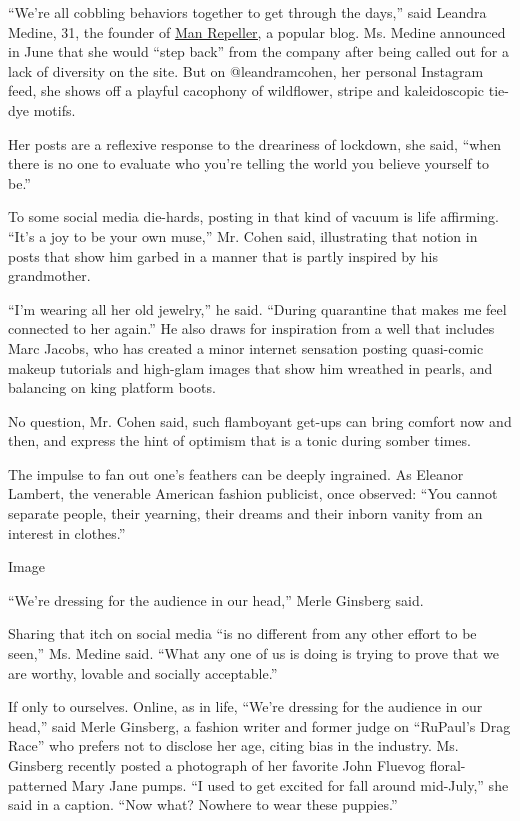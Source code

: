 ``We're all cobbling behaviors together to get through the days,'' said
Leandra Medine, 31, the founder of
\href{https://www.manrepeller.com/}{Man Repeller,} a popular blog. Ms.
Medine announced in June that she would ``step back'' from the company
after being called out for a lack of diversity on the site. But on
@leandramcohen, her personal Instagram feed, she shows off a playful
cacophony of wildflower, stripe and kaleidoscopic tie-dye motifs.

Her posts are a reflexive response to the dreariness of lockdown, she
said, ``when there is no one to evaluate who you're telling the world
you believe yourself to be.''

To some social media die-hards, posting in that kind of vacuum is life
affirming. ``It's a joy to be your own muse,'' Mr. Cohen said,
illustrating that notion in posts that show him garbed in a manner that
is partly inspired by his grandmother.

``I'm wearing all her old jewelry,'' he said. ``During quarantine that
makes me feel connected to her again.'' He also draws for inspiration
from a well that includes Marc Jacobs, who has created a minor internet
sensation posting quasi-comic makeup tutorials and high-glam images that
show him wreathed in pearls, and balancing on king platform boots.

No question, Mr. Cohen said, such flamboyant get-ups can bring comfort
now and then, and express the hint of optimism that is a tonic during
somber times.

The impulse to fan out one's feathers can be deeply ingrained. As
Eleanor Lambert, the venerable American fashion publicist, once
observed: ``You cannot separate people, their yearning, their dreams and
their inborn vanity from an interest in clothes.''

Image

``We're dressing for the audience in our head,'' Merle Ginsberg said.

Sharing that itch on social media ``is no different from any other
effort to be seen,'' Ms. Medine said. ``What any one of us is doing is
trying to prove that we are worthy, lovable and socially acceptable.''

If only to ourselves. Online, as in life, ``We're dressing for the
audience in our head,'' said Merle Ginsberg, a fashion writer and former
judge on ``RuPaul's Drag Race'' who prefers not to disclose her age,
citing bias in the industry. Ms. Ginsberg recently posted a photograph
of her favorite John Fluevog floral-patterned Mary Jane pumps. ``I used
to get excited for fall around mid-July,'' she said in a caption. ``Now
what? Nowhere to wear these puppies.''

